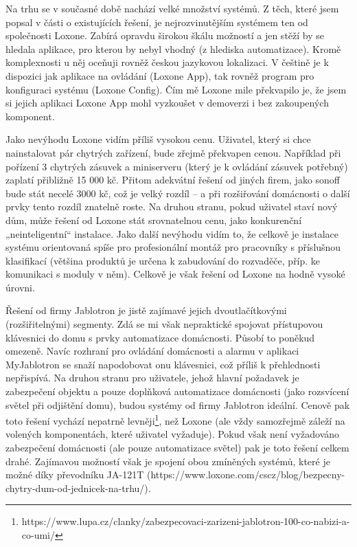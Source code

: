 Na trhu se v současné době nachází velké množství systémů. Z těch, které jsem popsal v části o existujících řešení, je nejrozvinutějším systémem ten od společnosti Loxone. Zabírá opravdu širokou škálu možností a jen stěží by se hledala aplikace, pro kterou by nebyl vhodný (z hlediska automatizace). Kromě komplexnosti u něj oceňuji rovněž českou jazykovou lokalizaci. V češtině je k dispozici jak aplikace na ovládání (Loxone App), tak rovněž program pro konfiguraci systému (Loxone Config). Čím mě Loxone mile překvapilo je, že jsem si jejich aplikaci Loxone App mohl vyzkoušet v demoverzi i bez zakoupených komponent.

Jako nevýhodu Loxone vidím příliš vysokou cenu. Uživatel, který si chce nainstalovat pár chytrých zařízení, bude zřejmě překvapen cenou. Například při pořízení 3 chytrých zásuvek a miniserveru (který je k ovládání zásuvek potřebný) zaplatí přibližně 15 000 kč. Přitom adekvátní řešení od jiných firem, jako sonoff bude stát necelé 3000 kč, což je velký rozdíl – a při rozšiřování domácnosti o další prvky tento rozdíl znatelně roste. Na druhou stranu, pokud uživatel staví nový dům, může řešení od Loxone stát srovnatelnou cenu, jako konkurenční „neinteligentní“ instalace. Jako další nevýhodu vidím to, že celkově je instalace systému orientovaná spíše pro profesionální montáž pro pracovníky s příslušnou klasifikací (většina produktů je určena k zabudování do rozvaděče, příp. ke komunikaci s moduly v něm). Celkově je však řešení od Loxone na hodně vysoké úrovni.

Řešení od firmy Jablotron je jistě zajímavé jejich dvoutlačítkovými (rozšiřitelnými) segmenty. Zdá se mi však nepraktické spojovat přístupovou klávesnici do domu s prvky automatizace domácnosti. Působí to poněkud omezeně. Navíc rozhraní pro ovládání domácnosti a alarmu v aplikaci MyJablotron se snaží napodobovat onu klávesnici, což příliš k přehlednosti nepřispívá. Na druhou stranu pro uživatele, jehož hlavní požadavek je zabezpečení objektu a pouze doplňková automatizace domácnosti (jako rozsvícení světel při odjištění domu), budou systémy od firmy Jablotron ideální. Cenově pak toto řešení vychází nepatrně levněji\footnote{https://www.lupa.cz/clanky/zabezpecovaci-zarizeni-jablotron-100-co-nabizi-a-co-umi/}, než Loxone (ale vždy samozřejmě záleží na volených komponentách, které uživatel vyžaduje). Pokud však není vyžadováno zabezpečení domácnosti (ale pouze automatizace světel) pak je toto řešení celkem drahé. Zajímavou možností však je spojení obou zmíněných systémů, které je možné díky převodníku JA-121T (https://www.loxone.com/cscz/blog/bezpecny-chytry-dum-od-jednicek-na-trhu/).

